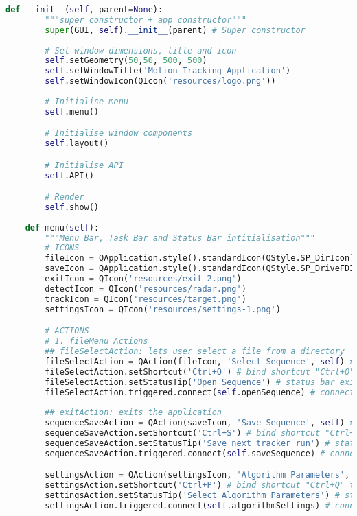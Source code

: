 \begin{lstlisting}[language=Python, caption={GUI Impementation Code}, captionpos=b, label={lst:gui}]
    def __init__(self, parent=None):
        """super constructor + app constructor"""
        super(GUI, self).__init__(parent) # Super constructor
      
        # Set window dimensions, title and icon
        self.setGeometry(50,50, 500, 500)
        self.setWindowTitle('Motion Tracking Application')
        self.setWindowIcon(QIcon('resources/logo.png'))
                
        # Initialise menu
        self.menu() 

        # Initialise window components
        self.layout()

        # Initialise API
        self.API()

        # Render
        self.show()
             
    def menu(self):               
        """Menu Bar, Task Bar and Status Bar intitialisation"""     
        # ICONS
        fileIcon = QApplication.style().standardIcon(QStyle.SP_DirIcon)
        saveIcon = QApplication.style().standardIcon(QStyle.SP_DriveFDIcon)
        exitIcon = QIcon('resources/exit-2.png')
        detectIcon = QIcon('resources/radar.png')
        trackIcon = QIcon('resources/target.png')
        settingsIcon = QIcon('resources/settings-1.png')

        # ACTIONS        
        # 1. fileMenu Actions
        ## fileSelectAction: lets user select a file from a directory 
        fileSelectAction = QAction(fileIcon, 'Select Sequence', self) # Exit Action Object
        fileSelectAction.setShortcut('Ctrl+O') # bind shortcut "Ctrl+Q" to Exit Button
        fileSelectAction.setStatusTip('Open Sequence') # status bar exit message
        fileSelectAction.triggered.connect(self.openSequence) # connect QtGui quit() method 
        
        ## exitAction: exits the application
        sequenceSaveAction = QAction(saveIcon, 'Save Sequence', self) # Exit Action Object
        sequenceSaveAction.setShortcut('Ctrl+S') # bind shortcut "Ctrl+Q" to Exit Button
        sequenceSaveAction.setStatusTip('Save next tracker run') # status bar exit message
        sequenceSaveAction.triggered.connect(self.saveSequence) # connect QtGui quit() method  

        settingsAction = QAction(settingsIcon, 'Algorithm Parameters', self) # Exit Action Object
        settingsAction.setShortcut('Ctrl+P') # bind shortcut "Ctrl+Q" to Exit Button
        settingsAction.setStatusTip('Select Algorithm Parameters') # status bar exit message
        settingsAction.triggered.connect(self.algorithmSettings) # connect QtGui quit() method  



\end{lstlisting}
